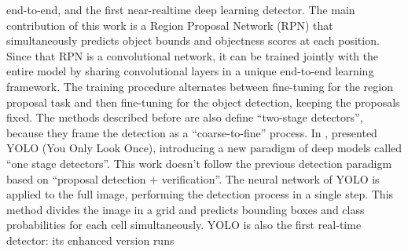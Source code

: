  end-to-end, and the first near-realtime deep learning detector. The main contribution of this work is a Region Proposal Network (RPN) that simultaneously predicts object bounds and objectness scores at each position. Since that RPN is a convolutional network, it can be trained jointly with the entire model by sharing convolutional layers in a unique end-to-end learning framework. The training procedure alternates between fine-tuning for the region proposal task and then fine-tuning for the object detection, keeping the proposals fixed. The methods described before are also define ``two-stage detectors'', because they frame the detection as a ``coarse-to-fine'' process. In \cite{yolo}, \citeauthor{yolo} presented YOLO (You Only Look Once), introducing a new paradigm of deep models called ``one stage detectors''. This work doesn't follow the previous detection paradigm based on ``proposal detection + verification''. The neural network of YOLO is applied to the full image, performing the detection process in a single step. This method divides the image in a grid and predicts bounding boxes and class probabilities for each cell simultaneously. YOLO is also the first real-time detector: its enhanced version runs
